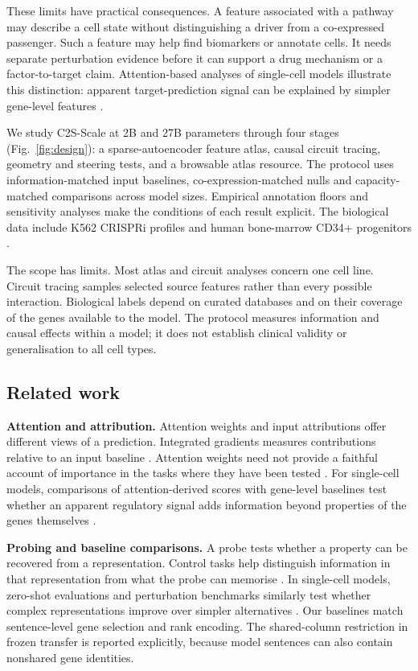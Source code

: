 \documentclass[review,authoryear,12pt]{elsarticle}
\begin{document}
These limits have practical consequences. A feature associated with a pathway may describe a cell
state without distinguishing a driver from a co-expressed passenger. Such a feature may help find
biomarkers or annotate cells. It needs separate perturbation evidence before it can support a drug
mechanism or a factor-to-target claim. Attention-based analyses of single-cell models illustrate this
distinction: apparent target-prediction signal can be explained by simpler gene-level features
\citep{ref9}.

We study C2S-Scale at 2B and 27B parameters through four stages (Fig.~\ref{fig:design}): a sparse-autoencoder
feature atlas, causal circuit tracing, geometry and steering tests, and a browsable atlas resource.
The protocol uses information-matched input baselines, co-expression-matched nulls and
capacity-matched comparisons across model sizes. Empirical annotation floors and sensitivity analyses
make the conditions of each result explicit. The biological data include K562 CRISPRi profiles
\citep{ref24} and human bone-marrow CD34+ progenitors \citep{ref25}.

The scope has limits. Most atlas and circuit analyses concern one cell line. Circuit tracing samples
selected source features rather than every possible interaction. Biological labels depend on curated
databases and on their coverage of the genes available to the model. The protocol measures information
and causal effects within a model; it does not establish clinical validity or generalisation to all
cell types.

\subsection{Related work}

\textbf{Attention and attribution.} Attention weights and input attributions offer different views of a
prediction. Integrated gradients measures contributions relative to an input baseline
\citep{refIntegratedGradients}. Attention weights need not provide a faithful account of importance
in the tasks where they have been tested \citep{refAttentionExplanation}. For single-cell models,
comparisons of attention-derived scores with gene-level baselines test whether an apparent regulatory
signal adds information beyond properties of the genes themselves \citep{ref9}.

\textbf{Probing and baseline comparisons.} A probe tests whether a property can be recovered from a
representation. Control tasks help distinguish information in that representation from what the probe
can memorise \citep{refProbeControls}. In single-cell models, zero-shot evaluations and perturbation
benchmarks similarly test whether complex representations improve over simpler alternatives
\citep{ref5,refPerturbBaselines}. Our baselines match sentence-level gene selection and rank encoding.
The shared-column restriction in frozen transfer is reported explicitly, because model sentences
can also contain nonshared gene identities.
\end{document}
